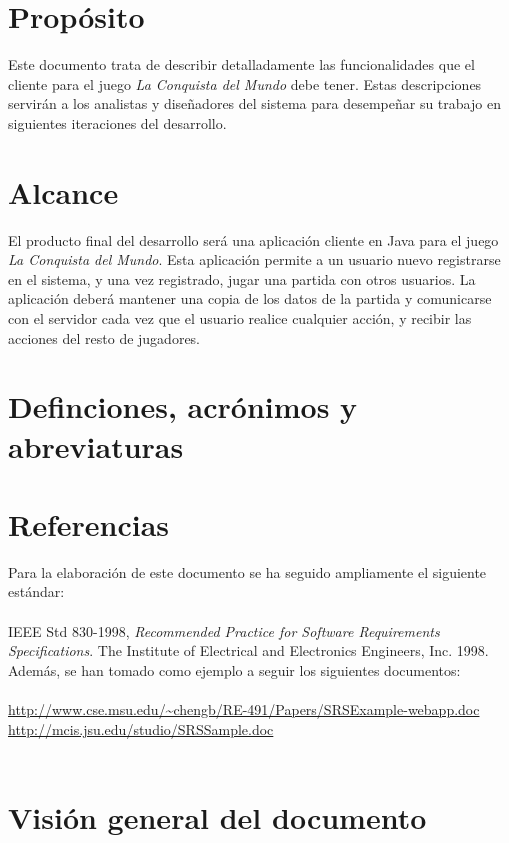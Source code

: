 \section{Propósito}

Este documento trata de describir detalladamente las funcionalidades que el
cliente para el juego \textit{La Conquista del Mundo} debe tener. Estas
descripciones servirán a los analistas y diseñadores del sistema para
desempeñar su trabajo en siguientes iteraciones del desarrollo.

\section{Alcance}

El producto final del desarrollo será una aplicación cliente en Java para el
juego \textit{La Conquista del Mundo}. Esta aplicación permite a un usuario
nuevo registrarse en el sistema, y una vez registrado, jugar una partida con
otros usuarios. La aplicación deberá mantener una copia de los datos de la
partida y comunicarse con el servidor cada vez que el usuario realice cualquier
acción, y recibir las acciones del resto de jugadores.

\section{Definciones, acrónimos y abreviaturas}


\section{Referencias}

Para la elaboración de este documento se ha seguido ampliamente el siguiente
estándar:\\
\\
IEEE Std 830-1998, \textit{Recommended Practice for Software Requirements
Specifications}.
The Institute of Electrical and Electronics Engineers, Inc. 1998.\\

Además, se han tomado como ejemplo a seguir los siguientes documentos:\\
\\
{\small
\url{http://www.cse.msu.edu/~chengb/RE-491/Papers/SRSExample-webapp.doc}\\
\url{http://mcis.jsu.edu/studio/SRSSample.doc}\\
}\\

\section{Visión general del documento}

